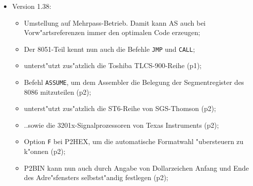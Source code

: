 \documentclass[12pt,a4paper,twoside]{report}
\newcommand{\tty}[1]{{\tt #1}}
\begin{document}
{\begin{itemize}
{\begin{itemize}
      \item{Neue Funktionen \tty{ABS} und \tty{SGN};}
      \item{Neue Pseudovariablen \tty{MOMFILE} und \tty{MOMLINE};}
      \item{Ausgabem"oglichkeit erweiterter Fehlermeldungen;}
      \item{Befehle \tty{IFUSED} und \tty{IFNUSED}, um abzufragen, ob ein
            Symbol bisher benutzt wurde;}
      \item{Die Environment-Variablen \tty{ASCMD}, \tty{BINDCMD} usw. k"onnen auch
            einen Dateinamen enthalten, in dem f"ur die Optionen mehr
            Platz ist;}
      \item{P2HEX erzeugt nun die von Microchip vorgegebenen Hex-Formate
            (p4);}
      \item{mit der Seitenl"angenangabe 0 k"onnen automatische
            Seitenvorsch"ube im Listing vollst"andig unterdr"uckt werden
            (p4);}
      \item{neue Kommandozeilenoption \tty{P}, um die Ausgabe des Makroprozessors
            in eine Datei zu schreiben (p4);}
      \item{in der Kommandozeile definierte Symbole d"urfen nun auch mit
            einem frei w"ahlbaren Wert belegt werden (p5).}
      \end{itemize}}
\item{Version 1.38:
      \begin{itemize}
      \item{Umstellung auf Mehrpass-Betrieb.  Damit kann AS auch bei
            Vorw"artsreferenzen immer den optimalen Code erzeugen;}
      \item{Der 8051-Teil kennt nun auch die Befehle \tty{JMP} und \tty{CALL};}
      \item{unterst"utzt zus"atzlich die Toshiba TLCS-900-Reihe (p1);}
      \item{Befehl \tty{ASSUME}, um dem Assembler die Belegung der
            Segmentregister des 8086 mitzuteilen (p2);}
      \item{unterst"utzt zus"atzlich die ST6-Reihe von SGS-Thomson (p2);}
      \item{..sowie die 3201x-Signalprozessoren von Texas Instruments (p2);}
      \item{Option \tty{F} bei P2HEX, um die automatische Formatwahl "ubersteuern
            zu k"onnen (p2);}
      \item{P2BIN kann nun auch durch Angabe von Dollarzeichen Anfang und
            Ende des Adre"sfensters selbstst"andig festlegen (p2);}

\end{itemize}}
\end{itemize}}
\end{document}
